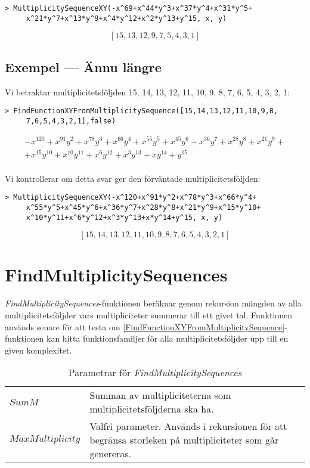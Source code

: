 \begin{verbatim}
> MultiplicitySequenceXY(-x^69+x^44*y^3+x^37*y^4+x^31*y^5+
     x^21*y^7+x^13*y^9+x^4*y^12+x^2*y^13+y^15, x, y)
\end{verbatim}
\[\left[15, 13, 12, 9, 7, 5, 4, 3, 1\right]\]

\subsection{Exempel --- Ännu längre}

Vi betraktar multiplicitetsföljden 15, 14, 13, 12, 11, 10, 9, 8, 7, 6, 5, 4, 3, 2, 1:

\begin{verbatim}
> FindFunctionXYFromMultiplicitySequence([15,14,13,12,11,10,9,8,
     7,6,5,4,3,2,1],false)
\end{verbatim}
\[
\begin{array}{l}
-x^{120}+x^{91}y^2+x^{78}y^3+x^{66}y^4+x^{55}y^5+x^{45}y^6+x^{36}y^7+x^{28}y^8+x^{21}y^9+\\
+x^{15}y^{10}+x^{10}y^{11}+x^6y^12+x^3y^{13}+xy^{14}+y^{15}\\
\end{array}
\]

Vi kontrollerar om detta svar ger den förväntade multiplicitetsföljden:

\begin{verbatim}
> MultiplicitySequenceXY(-x^120+x^91*y^2+x^78*y^3+x^66*y^4+
     x^55*y^5+x^45*y^6+x^36*y^7+x^28*y^8+x^21*y^9+x^15*y^10+
     x^10*y^11+x^6*y^12+x^3*y^13+x*y^14+y^15, x, y)
\end{verbatim}
\[\left[15, 14, 13, 12, 11, 10, 9, 8, 7, 6, 5, 4, 3, 2, 1\right]\]

\section{FindMultiplicitySequences}

\emph{FindMultiplicitySequences}-funktionen beräknar genom rekursion mängden av alla multiplicitetsföljder vars multipliciteter summerar till ett givet tal. Funktionen används senare för att testa om \ref{FindFunctionXYFromMultiplicitySequence}-funktionen kan hitta funktionsfamiljer för alla multiplicitetsföljder upp till en given komplexitet.

\begin{table}[h]
\caption{Parametrar för \emph{FindMultiplicitySequences}}
\begin{center}
\begin{tabular}{|l|p{9cm}|}
\hline
$SumM$ & Summan av multipliciteterna som multiplicitetsföljderna ska ha.\\
$MaxMultiplicity$ & Valfri parameter. Används i rekursionen för att begränsa storleken på multipliciteter som går genereras.\\
\hline
\end{tabular}
\end{center}
\end{table}

